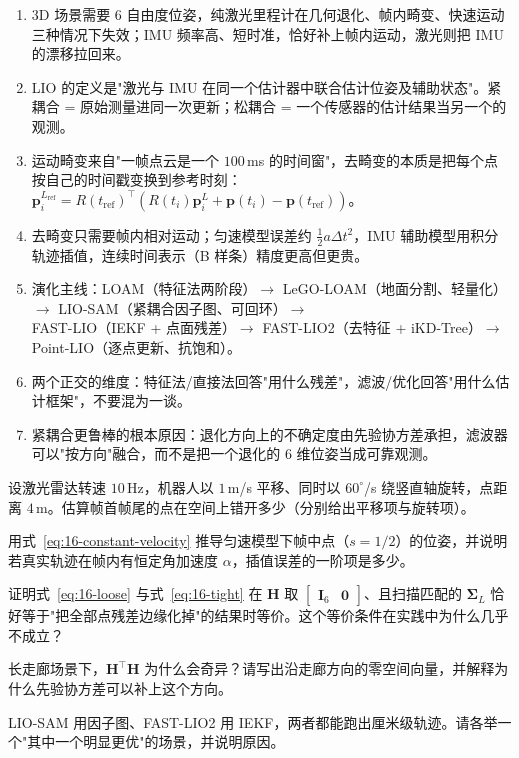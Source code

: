 \begin{summary}

\begin{enumerate}
  \item 3D 场景需要 6 自由度位姿，纯激光里程计在几何退化、帧内畸变、快速运动三种情况下失效；IMU 频率高、短时准，恰好补上帧内运动，激光则把 IMU 的漂移拉回来。
  \item LIO 的定义是"激光与 IMU 在同一个估计器中联合估计位姿及辅助状态"。紧耦合 = 原始测量进同一次更新；松耦合 = 一个传感器的估计结果当另一个的观测。
  \item 运动畸变来自"一帧点云是一个 $100$\,ms 的时间窗"，去畸变的本质是把每个点按自己的时间戳变换到参考时刻：$\bm{p}_i^{L_{\mathrm{ref}}}=R(t_{\mathrm{ref}})^{\top}(R(t_i)\bm{p}_i^{L}+\bm{p}(t_i)-\bm{p}(t_{\mathrm{ref}}))$。
  \item 去畸变只需要帧内相对运动；匀速模型误差约 $\frac12 a\Delta t^2$，IMU 辅助模型用积分轨迹插值，连续时间表示（B 样条）精度更高但更贵。
  \item 演化主线：LOAM（特征法两阶段）$\to$ LeGO-LOAM（地面分割、轻量化）$\to$ LIO-SAM（紧耦合因子图、可回环）$\to$ FAST-LIO（IEKF + 点面残差）$\to$ FAST-LIO2（去特征 + iKD-Tree）$\to$ Point-LIO（逐点更新、抗饱和）。
  \item 两个正交的维度：特征法/直接法回答"用什么残差"，滤波/优化回答"用什么估计框架"，不要混为一谈。
  \item 紧耦合更鲁棒的根本原因：退化方向上的不确定度由先验协方差承担，滤波器可以"按方向"融合，而不是把一个退化的 6 维位姿当成可靠观测。
\end{enumerate}


\end{summary}

\begin{problemset}

  \item 设激光雷达转速 $10$\,Hz，机器人以 $1$\,m/s 平移、同时以 $60^{\circ}$/s 绕竖直轴旋转，点距离 $4$\,m。估算帧首帧尾的点在空间上错开多少（分别给出平移项与旋转项）。
  \item 用式~\eqref{eq:16-constant-velocity} 推导匀速模型下帧中点（$s=1/2$）的位姿，并说明若真实轨迹在帧内有恒定角加速度 $\alpha$，插值误差的一阶项是多少。
  \item 证明式~\eqref{eq:16-loose} 与式~\eqref{eq:16-tight} 在 $\bm{H}$ 取 $\begin{bmatrix}\bm{I}_6&\bm{0}\end{bmatrix}$、且扫描匹配的 $\bm{\Sigma}_L$ 恰好等于"把全部点残差边缘化掉"的结果时等价。这个等价条件在实践中为什么几乎不成立？
  \item 长走廊场景下，$\bm{H}^{\top}\bm{H}$ 为什么会奇异？请写出沿走廊方向的零空间向量，并解释为什么先验协方差可以补上这个方向。
  \item LIO-SAM 用因子图、FAST-LIO2 用 IEKF，两者都能跑出厘米级轨迹。请各举一个"其中一个明显更优"的场景，并说明原因。
\end{problemset}

